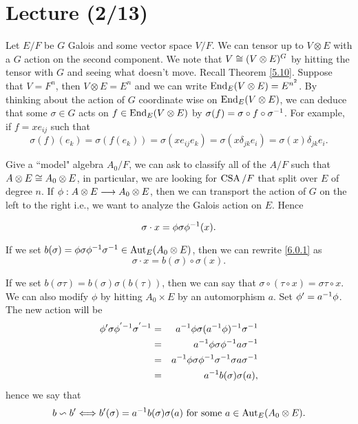 \section{Lecture (2/13)}
Let $E/F$ be $G$ Galois and some vector space $V/F$. We can tensor up to $V \otimes E$ with a $G$ action on the second component. We note that $V \cong (V\otimes E)^G$ by hitting the tensor with $G$ and seeing what doesn't move. Recall Theorem \ref{5.10}.
Suppose that $V  = F^n$, then $V \otimes E = E^n$ and we can write $\operatorname{End}_E(V\otimes E) = E^{n^2}$. By thinking about the action of $G$ coordinate wise on $\operatorname{End}_E(V\otimes E)$, we can deduce that some $\sigma \in G$ acts on $f \in \operatorname{End}_E(V\otimes E)$ by $\sigma (f) = \sigma \circ f \circ \sigma^{-1}$. For example, if $f = xe_{ij}$ such that $$\sigma(f)(e_k) = \sigma (f(e_k)) = \sigma (xe_{ij}e_k) = \sigma(x\delta_{jk}e_i) = \sigma (x)\delta_{jk}e_i .$$ 


Give a ``model" algebra $A_0/F$, we can ask to classify all of the $A/F$ such that $A\otimes E \cong A_0 \otimes E$, in particular, we are looking for $\operatorname{CSA}/F$ that split over $E$ of degree $n$. If $\phi : A\otimes E \longrightarrow A_0 \otimes E$, then we can transport the action of $G$ on the left to the right i.e., we want to analyze the Galois action on $E$. Hence 

\begin{equation}\label{6.0.1}
\sigma \cdot x = \phi \sigma \phi^{-1} (x).
\end{equation}

If we set $b(\sigma) = \phi \sigma \phi^{-1} \sigma ^{-1} \in \operatorname{Aut}_E(A_0 \otimes E)$, then we can rewrite \eqref{6.0.1} as
\begin{equation}\label{6.0.2}
\sigma \cdot x = b(\sigma) \circ \sigma (x).
\end{equation}

If we set $b (\sigma \tau) = b(\sigma)\sigma (b(\tau))$, then we can say that $\sigma \circ ( \tau \circ x) = \sigma\tau \circ x$. We can also modify $\phi$ by hitting $A_0\times E$ by an automorphism $a$. Set $\phi ' = a^{-1} \phi$. The new action will be 
\begin{eqnarray*}
\phi ' \sigma \phi^{'-1}\sigma^{'-1} &=& a^{-1} \phi \sigma (a^{-1} \phi)^{-1} \sigma ^{-1}  \\
& = & a^{-1} \phi\sigma \phi^{-1} a \sigma ^{-1} \\
& = & a^{-1} \phi \sigma \phi^{-1} \sigma ^{-1} \sigma a \sigma ^{-1} \\
& = & a^{-1} b(\sigma)\sigma(a),
\end{eqnarray*}
hence we say that $$b \backsim b' \Longleftrightarrow b'(\sigma) = a^{-1} b(\sigma)\sigma (a) \text{ for some } a \in \operatorname{Aut}_E(A_0 \otimes E).$$

